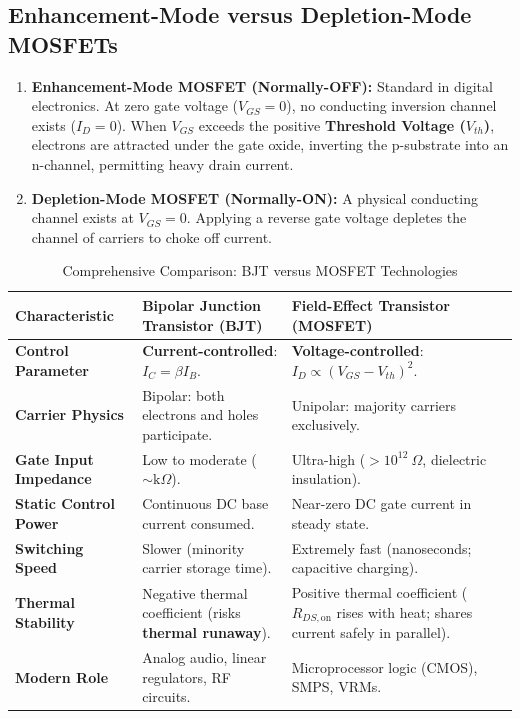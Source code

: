 \subsection{Enhancement-Mode versus Depletion-Mode MOSFETs}
\begin{enumerate}[label=\bfseries\arabic*.]
    \item \textbf{Enhancement-Mode MOSFET (Normally-OFF):} Standard in digital electronics. At zero gate voltage ($V_{GS} = 0$), no conducting inversion channel exists ($I_D = 0$). When $V_{GS}$ exceeds the positive \textbf{Threshold Voltage ($V_{th}$)}, electrons are attracted under the gate oxide, inverting the p-substrate into an n-channel, permitting heavy drain current.
    \item \textbf{Depletion-Mode MOSFET (Normally-ON):} A physical conducting channel exists at $V_{GS} = 0$. Applying a reverse gate voltage depletes the channel of carriers to choke off current.
\end{enumerate}

\begin{table}[htbp]
\centering
\small
\caption{Comprehensive Comparison: BJT versus MOSFET Technologies}
\label{tab:bjt_vs_mosfet}
\begin{tabularx}{\textwidth}{l X X}
\toprule
\textbf{Characteristic} & \textbf{Bipolar Junction Transistor (BJT)} & \textbf{Field-Effect Transistor (MOSFET)} \\
\midrule
\textbf{Control Parameter} & \textbf{Current-controlled}: $I_C = \beta I_B$. & \textbf{Voltage-controlled}: $I_D \propto (V_{GS} - V_{th})^2$. \\
\textbf{Carrier Physics} & Bipolar: both electrons and holes participate. & Unipolar: majority carriers exclusively. \\
\textbf{Gate Input Impedance} & Low to moderate ($\sim \text{k}\Omega$). & Ultra-high ($>10^{12}\ \Omega$, dielectric insulation). \\
\textbf{Static Control Power} & Continuous DC base current consumed. & Near-zero DC gate current in steady state. \\
\textbf{Switching Speed} & Slower (minority carrier storage time). & Extremely fast (nanoseconds; capacitive charging). \\
\textbf{Thermal Stability} & Negative thermal coefficient (risks \textbf{thermal runaway}). & Positive thermal coefficient ($R_{DS,\text{on}}$ rises with heat; shares current safely in parallel). \\
\textbf{Modern Role} & Analog audio, linear regulators, RF circuits. & Microprocessor logic (CMOS), SMPS, VRMs. \\
\bottomrule
\end{tabularx}
\end{table}


